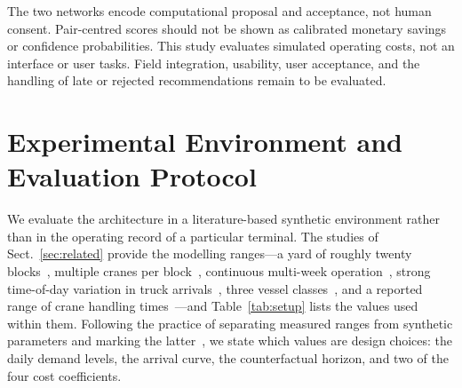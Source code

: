 \documentclass[a4paper]{llncs}
\begin{document}
The two networks encode computational proposal and acceptance, not
human consent. Pair-centred scores should not be shown as calibrated
monetary savings or confidence probabilities. This study evaluates
simulated operating costs, not an interface or user tasks. Field
integration, usability, user acceptance, and the handling of late or
rejected recommendations remain to be evaluated.

\section{Experimental Environment and Evaluation Protocol}
\label{sec:env}
We evaluate the architecture in a literature-based synthetic environment
rather than in the operating record of a particular terminal. The
studies of Sect.~\ref{sec:related} provide the modelling ranges---a
yard of roughly twenty blocks~\cite{ref16}, multiple cranes per block~\cite{ref8}, continuous
multi-week operation~\cite{ref9}, strong time-of-day variation in truck
arrivals~\cite{ref13}, three vessel classes~\cite{ref16}, and a reported
range of crane handling times~\cite{ref9}---and Table~\ref{tab:setup}
lists the values used within them. Following the practice of separating measured ranges from synthetic
parameters and marking the latter~\cite{ref20}, we state which values are
design choices: the daily demand levels, the arrival curve, the
counterfactual horizon, and two of the four cost coefficients.
\end{document}
